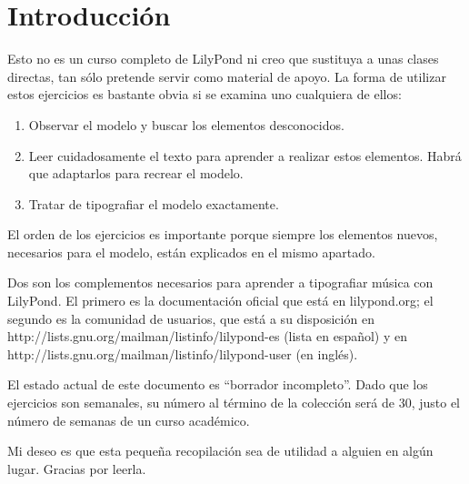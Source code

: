 \section*{Introducción}

Esto no es un curso completo de LilyPond ni creo que sustituya a unas
clases directas, tan sólo pretende servir como material de apoyo. La
forma de utilizar estos ejercicios es bastante obvia si se examina uno
cualquiera de ellos:

\begin{enumerate}
\item Observar el modelo y buscar los elementos desconocidos.

\item Leer cuidadosamente el texto para aprender a realizar estos elementos.
Habrá que adaptarlos para recrear el modelo.

\item Tratar de tipografiar el modelo exactamente.

\end{enumerate}

El orden de los ejercicios es importante porque siempre los elementos
nuevos, necesarios para el modelo, están explicados en el mismo
apartado.

Dos son los complementos necesarios para aprender a tipografiar música
con LilyPond.  El primero es la documentación oficial que está en
lilypond.org; el segundo es la comunidad de usuarios, que está a su
disposición en http://lists.gnu.org/mailman/listinfo/lilypond-es
(lista en español) y en
http://lists.gnu.org/mailman/listinfo/lilypond-user (en inglés).

El estado actual de este documento es ``borrador incompleto''.  Dado
que los ejercicios son semanales, su número al término de la colección
será de 30, justo el número de semanas de un curso académico.


Mi deseo es que esta pequeña recopilación sea de utilidad a alguien en
algún lugar.  Gracias por leerla.


